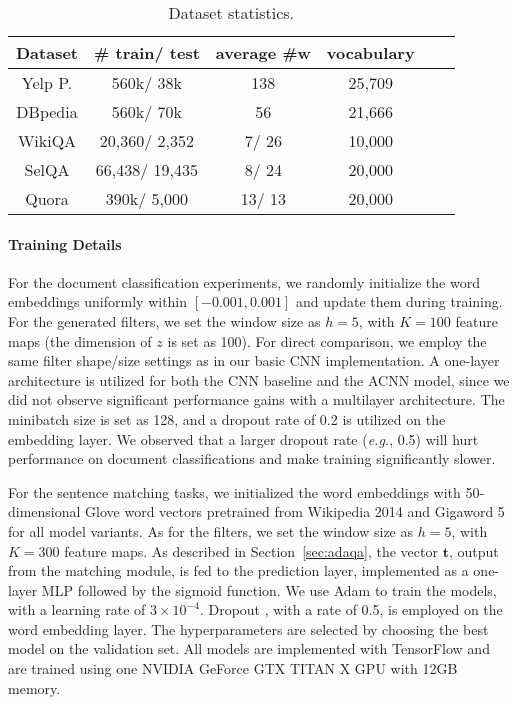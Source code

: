 \documentclass[11pt,a4paper]{article}
\begin{document}
\begin{table}[t!] \small
\centering
\begin{tabular}{cccccc}
\toprule[1.2pt]
		\textbf{Dataset} & \textbf{\# \textbf{train}/ \textbf{test}} & \textbf{average \#w} & \textbf{vocabulary} \\
		\hline
		Yelp P.       &  560k/ 38k & 138 & 25,709  \\
		DBpedia         & 560k/ 70k & 56 &  21,666 \\
		\hline 
		WikiQA       &  20,360/ 2,352 & 7/ 26 & 10,000  \\
		SelQA         & 66,438/ 19,435 & 8/ 24 &  20,000 \\
		Quora       & 390k/ 5,000 & 13/ 13 & 20,000  \\
		\bottomrule[1.2pt]
	\end{tabular}
	\vspace{-3mm}
	\caption{\small Dataset statistics.}
	\label{tab:summary}
	\vspace{-4mm}
\end{table}

\paragraph{Training Details}
For the document classification experiments, we randomly initialize the word embeddings uniformly within $[-0.001, 0.001]$ and update them during training. For the generated filters, we set the window size as $h=5$, with $K=100$ feature maps (the dimension of $z$ is set as 100). For direct comparison, we employ the same filter shape/size settings as in our basic CNN implementation. A one-layer architecture is utilized for both the CNN baseline and the ACNN model, since we did not observe significant performance gains with a multilayer architecture. 
The minibatch size is set as 128, and a dropout rate of 0.2 is utilized on the embedding layer. We observed that a larger dropout rate (\emph{e.g.}, 0.5) will hurt performance on document classifications and make training significantly slower. 

For the sentence matching tasks, we initialized the word embeddings with 50-dimensional Glove \citep{pennington2014glove} 
word vectors pretrained from Wikipedia 2014 and Gigaword 5 \citep{pennington2014glove} for all model variants. As for the filters, we set the window size as $h=5$, with $K=300$ feature maps. As described in Section~\ref{sec:adaqa}, the vector $\boldsymbol{t}$, output from the matching module, is fed to the prediction layer, implemented as a one-layer MLP followed by the sigmoid function. We use Adam \citep{kingma2014adam} to train the models, with a learning rate of $3 \times 10^{-4}$. Dropout \citep{srivastava2014dropout}, with a rate of 0.5, is employed on the word embedding layer. The hyperparameters are selected by choosing the best model on the validation set. All models are implemented with TensorFlow \cite{abadi2016tensorflow} and are trained using one NVIDIA GeForce GTX TITAN X GPU with 12GB memory. \par
\end{document}

